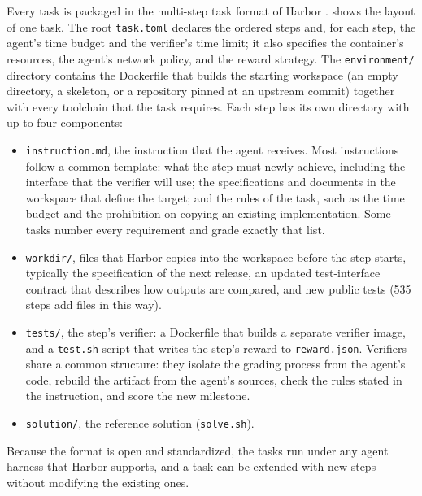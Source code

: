 \documentclass{article}
\begin{document}
Every task is packaged in the multi-step task format of Harbor
\citep{harbor2026}.  shows the layout of one task. The root
\texttt{task.toml} declares the ordered steps and, for each step, the agent's
time budget and the verifier's time limit; it also specifies the container's
resources, the agent's network policy, and the reward strategy. The
\texttt{environment/} directory contains the Dockerfile that builds the
starting workspace (an empty directory, a skeleton, or a repository pinned at
an upstream commit) together with every toolchain that the task requires. Each
step has its own directory with up to four components:
\begin{itemize}
  \item \texttt{instruction.md}, the instruction that the agent receives. Most
    instructions follow a common template: what the step must newly achieve,
    including the interface that the verifier will use; the specifications and
    documents in the workspace that define the target; and the rules of the
    task, such as the time budget and the prohibition on copying an existing
    implementation. Some tasks number every requirement and grade exactly that
    list.
  \item \texttt{workdir/}, files that Harbor copies into the workspace before
    the step starts, typically the specification of the next release, an
    updated test-interface contract that describes how outputs are compared,
    and new public tests (535 steps add files in this way).
  \item \texttt{tests/}, the step's verifier: a Dockerfile that builds a
    separate verifier image, and a \texttt{test.sh} script that writes the
    step's reward to \texttt{reward.json}. Verifiers share a common structure:
    they isolate the grading process from the agent's code, rebuild the
    artifact from the agent's sources, check the rules stated in the
    instruction, and score the new milestone.
  \item \texttt{solution/}, the reference solution (\texttt{solve.sh}).
\end{itemize}
Because the format is open and standardized, the tasks run under any agent
harness that Harbor supports, and a task can be extended with new steps without
modifying the existing ones.
\end{document}
